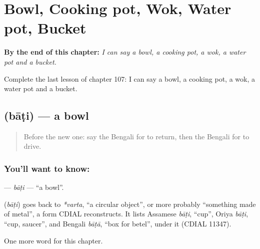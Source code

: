 
\chapter{Bowl, Cooking pot, Wok, Water pot, Bucket}
\label{ch:bn-bowl-cooking-pot-wok-water-pot-bucket}

\begin{chapteropening}
\textbf{By the end of this chapter:} \emph{I can say a bowl, a cooking pot, a wok, a water pot and a bucket.}

Complete the last lesson of chapter 107: I can say a bowl, a cooking pot, a wok, a water pot and a bucket.
\end{chapteropening}

\section[\texorpdfstring{\bn{বাটি} (bāṭi)}{বাটি (bāṭi)}]{ (bāṭi) — a bowl}

\label{lesson:BN-C107-bati}



\begin{quote}
Before the new one: say the Bengali for to return, then the Bengali for to drive.
\end{quote}

\subsection*{You'll want to know: }
\textbf{} — \emph{bāṭi} — \textquotedblleft{}a bowl\textquotedblright{}.

\begin{cousinweb}
\textbf{} (\emph{bāṭi}) goes back to \emph{*varta}, \textquotedblleft{}a circular object\textquotedblright{}, or more probably \textquotedblleft{}something made of metal\textquotedblright{}, a form CDIAL reconstructs. It lists Assamese \emph{bāṭi}, \textquotedblleft{}cup\textquotedblright{}, Oriya \emph{bāṭi}, \textquotedblleft{}cup, saucer\textquotedblright{}, and Bengali \emph{bāṭā}, \textquotedblleft{}box for betel\textquotedblright{}, under it (CDIAL 11347).
\end{cousinweb}

\begin{grammarlens}[title={What you've built}]
One more word for this chapter.
\end{grammarlens}

